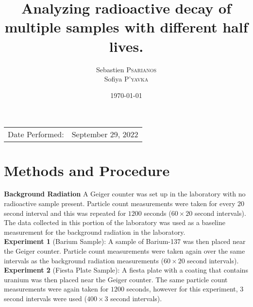 \documentclass[
	letterpaper, %
	10pt, %
]{CSUniSchoolLabReport}
\title{Analyzing radioactive decay of multiple samples with different half lives.}
\author{Sebastien \textsc{Psarianos}\\ Sofiya \textsc{P'yavka}}
\date{\today}
\begin{document}
\maketitle

\begin{center}
	\begin{tabular}{l r}
		Date Performed: & September 29, 2022 \\
	\end{tabular}
\end{center}

\section{Methods and Procedure}
\textbf{Background Radiation} A Geiger counter was set up in the laboratory with no radioactive sample present. Particle count measurements were taken for every $20$ second interval and this was repeated for $1200$ seconds ($60\times20$ second intervals). The data collected in this portion of the laboratory was used as a baseline measurement for the background radiation in the laboratory.\\

\textbf{Experiment 1} (Barium Sample): A sample of Barium-137 was then placed near the Geiger counter. Particle count measurements were taken again over the same intervals as the background radiation measurements ($60\times20$ second intervals).\\

\textbf{Experiment 2} (Fiesta Plate Sample): A fiesta plate with a coating that contains uranium was then placed near the Geiger counter. The same particle count measurements were again taken for $1200$ seconds, however for this experiment, $3$ second intervals were used ($400\times3$ second intervals).
\end{document}
